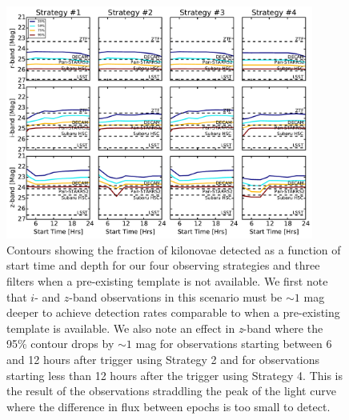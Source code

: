 \begin{figure}[t!]
\centering
\includegraphics[width=0.9\textwidth]{./figs/chapter2/ch2_f12.pdf}
\caption{Contours showing the fraction of kilonovae detected as a function of start time and depth for our four observing strategies and three filters when a pre-existing template is not available. We first note that $i$- and $z$-band observations in this scenario must be $\sim1$ mag deeper to achieve detection rates comparable to when a pre-existing template is available. We also note an effect in {\em z}-band where the 95\% contour drops by $\sim1$ mag for observations starting between 6 and 12 hours after trigger using Strategy 2 and for observations starting less than 12 hours after the trigger using Strategy 4. This is the result of the observations straddling the peak of the light curve where the difference in flux between epochs is too small to detect.}
\label{fig:detdiff}
\end{figure}

